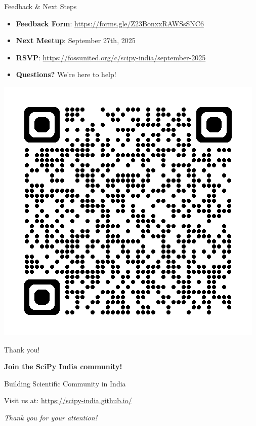 \documentclass[16pt,t]{beamer}
\begin{document}
\begin{frame}{Feedback \& Next Steps}
\begin{itemize}
    \item \textbf{Feedback Form}: \url{https://forms.gle/Z23BonxxRAWSsSNC6}
    \item \textbf{Next Meetup}: September 27th, 2025
    \item \textbf{RSVP}: \url{https://fossunited.org/c/scipy-india/september-2025}
    \item \textbf{Questions?} We're here to help!
\end{itemize}

\begin{center}
    \includegraphics[scale=0.3]{Figures/qr-code.png}
\end{center}
\end{frame}

\begin{frame}{Thank you!}
\begin{center}
\Large
\textbf{Join the SciPy India community!}

\vspace{1cm}

\large
Building Scientific Community in India

\vspace{1cm}

\normalsize
Visit us at: \url{https://scipy-india.github.io/}

\vspace{0.5cm}

\vspace{1cm}

\textit{Thank you for your attention!}
\end{center}
\end{frame}



% 
\end{document}
